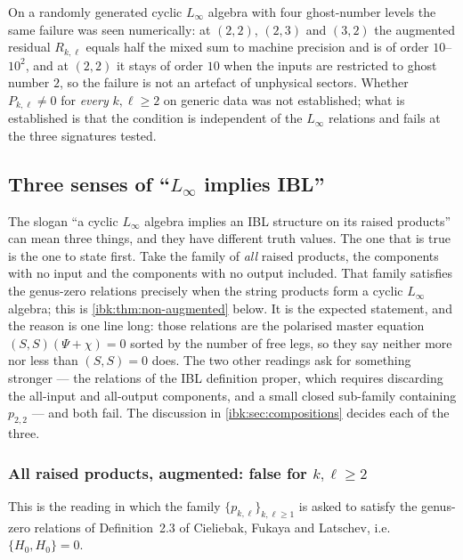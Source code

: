 On a randomly generated cyclic $L_\infty$ algebra with four ghost-number levels the same failure was seen numerically: at $(2,2)$, $(2,3)$ and $(3,2)$ the augmented residual $R_{k,\ell}$ equals half the mixed sum to machine precision and is of order $10$--$10^2$, and at $(2,2)$ it stays of order $10$ when the inputs are restricted to ghost number $2$, so the failure is not an artefact of unphysical sectors. Whether $P_{k,\ell}\neq0$ for \emph{every} $k,\ell\ge2$ on generic data was not established; what is established is that the condition is independent of the $L_\infty$ relations and fails at the three signatures tested.

\subsection{Three senses of \enquote{\texorpdfstring{$L_\infty$}{L-infinity} implies IBL}}
\label{ibk:sec:three-senses}

The slogan \enquote{a cyclic $L_\infty$ algebra implies an IBL structure on its raised products} can mean three things, and they have different truth values. The one that is true is the one to state first. Take the family of \emph{all} raised products, the components with no input and the components with no output included. That family satisfies the genus-zero relations precisely when the string products form a cyclic $L_\infty$ algebra; this is \cref{ibk:thm:non-augmented} below. It is the expected statement, and the reason is one line long: those relations are the polarised master equation $(S,S)(\Psi+\chi)=0$ sorted by the number of free legs, so they say neither more nor less than $(S,S)=0$ does. The two other readings ask for something stronger --- the relations of the IBL definition proper, which requires discarding the all-input and all-output components, and a small closed sub-family containing $p_{2,2}$ --- and both fail. The discussion in \cref{ibk:sec:compositions} decides each of the three.

\subsubsection{All raised products, augmented: false for \texorpdfstring{$k,\ell\ge2$}{k,l >= 2}}
\label{ibk:sec:senses:aug}

This is the reading in which the family $\{p_{k,\ell}\}_{k,\ell\ge1}$ is asked to satisfy the genus-zero relations of Definition~2.3 of Cieliebak, Fukaya and Latschev, i.e.\ $\{H_0,H_0\}=0$.

